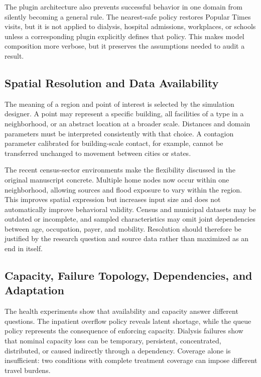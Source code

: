 \documentclass[pdflatex,sn-mathphys-num]{sn-jnl}%
\theoremstyle{thmstyleone}%
\theoremstyle{thmstyletwo}%
\theoremstyle{thmstylethree}%
\begin{document}
The plugin architecture also prevents successful behavior in one domain from silently becoming a general rule. The nearest-safe policy restores Popular Times visits, but it is not applied to dialysis, hospital admissions, workplaces, or schools unless a corresponding plugin explicitly defines that policy. This makes model composition more verbose, but it preserves the assumptions needed to audit a result.

\subsection{Spatial Resolution and Data Availability}
\label{discussion:spatial}

The meaning of a region and point of interest is selected by the simulation designer. A point may represent a specific building, all facilities of a type in a neighborhood, or an abstract location at a broader scale. Distances and domain parameters must be interpreted consistently with that choice. A contagion parameter calibrated for building-scale contact, for example, cannot be transferred unchanged to movement between cities or states.

The recent census-sector environments make the flexibility discussed in the original manuscript concrete. Multiple home nodes now occur within one neighborhood, allowing sources and flood exposure to vary within the region. This improves spatial expression but increases input size and does not automatically improve behavioral validity. Census and municipal datasets may be outdated or incomplete, and sampled characteristics may omit joint dependencies between age, occupation, payer, and mobility. Resolution should therefore be justified by the research question and source data rather than maximized as an end in itself.

\subsection{Capacity, Failure Topology, Dependencies, and Adaptation}

The health experiments show that availability and capacity answer different questions. The inpatient overflow policy reveals latent shortage, while the queue policy represents the consequence of enforcing capacity. Dialysis failures show that nominal capacity loss can be temporary, persistent, concentrated, distributed, or caused indirectly through a dependency. Coverage alone is insufficient: two conditions with complete treatment coverage can impose different travel burdens.
\end{document}
